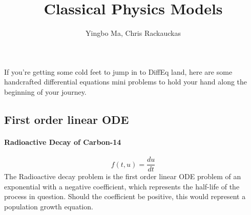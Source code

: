 \documentclass[12pt,a4paper]{article}
\title{ Classical Physics Models }
\author{ Yingbo Ma, Chris Rackauckas }
\begin{document}
\maketitle

If you're getting some cold feet to jump in to DiffEq land, here are some handcrafted differential equations mini problems to hold your hand along the beginning of your journey.

\subsection{First order linear ODE}
\paragraph{Radioactive Decay of Carbon-14}
\[
f(t,u) = \frac{du}{dt}
\]
The Radioactive decay problem is the first order linear ODE problem of an exponential with a negative coefficient, which represents the half-life of the process in question. Should the coefficient be positive, this would represent a population growth equation.
\end{document}

